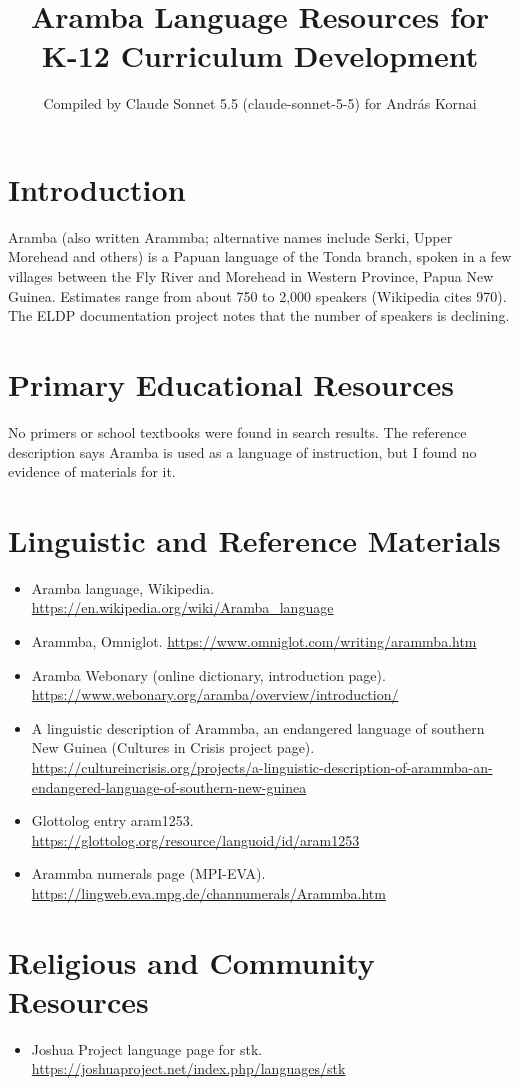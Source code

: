 \documentclass[12pt]{article}
\title{Aramba Language Resources for K-12 Curriculum Development}
\author{Compiled by Claude Sonnet 5.5 (claude-sonnet-5-5) for Andr\'as Kornai}
\date{}
\begin{document}
\maketitle

\section{Introduction}
Aramba (also written Arammba; alternative names include Serki, Upper Morehead and others) is a Papuan language of the Tonda branch, spoken in a few villages between the Fly River and Morehead in Western Province, Papua New Guinea. Estimates range from about 750 to 2,000 speakers (Wikipedia cites 970). The ELDP documentation project notes that the number of speakers is declining.

\section{Primary Educational Resources}
No primers or school textbooks were found in search results. The reference description says Aramba is used as a language of instruction, but I found no evidence of materials for it.

\section{Linguistic and Reference Materials}
\begin{itemize}
\item Aramba language, Wikipedia. \url{https://en.wikipedia.org/wiki/Aramba_language}
\item Arammba, Omniglot. \url{https://www.omniglot.com/writing/arammba.htm}
\item Aramba Webonary (online dictionary, introduction page). \url{https://www.webonary.org/aramba/overview/introduction/}
\item A linguistic description of Arammba, an endangered language of southern New Guinea (Cultures in Crisis project page). \url{https://cultureincrisis.org/projects/a-linguistic-description-of-arammba-an-endangered-language-of-southern-new-guinea}
\item Glottolog entry aram1253. \url{https://glottolog.org/resource/languoid/id/aram1253}
\item Arammba numerals page (MPI-EVA). \url{https://lingweb.eva.mpg.de/channumerals/Arammba.htm}
\end{itemize}

\section{Religious and Community Resources}
\begin{itemize}
\item Joshua Project language page for stk. \url{https://joshuaproject.net/index.php/languages/stk}
\end{itemize}
\end{document}
